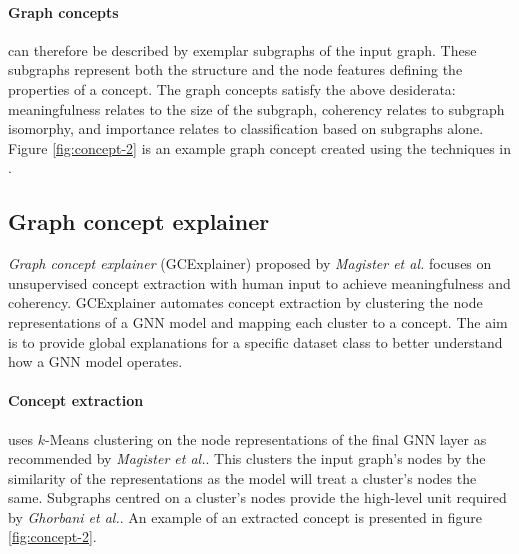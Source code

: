 
\paragraph{Graph concepts} can therefore be described by exemplar subgraphs of the input graph.
These subgraphs represent both the structure and the node features defining the properties of a concept.
The graph concepts satisfy the above desiderata: meaningfulness relates to the size of the subgraph, coherency relates to subgraph isomorphy, and importance relates to classification based on subgraphs alone.
Figure \ref{fig:concept-2} is an example graph concept created using the techniques in .



\subsection{Graph concept explainer}
\label{sec:GCE}



\emph{Graph concept explainer} (GCExplainer) proposed by \textit{Magister et al.}\cite{magister2021gcexplainer} focuses on unsupervised concept extraction with human input to achieve meaningfulness and coherency.
GCExplainer automates concept extraction by clustering the node representations of a GNN model and mapping each cluster to a concept.
The aim is to provide global explanations for a specific dataset class to better understand how a GNN model operates.



\paragraph{Concept extraction}
uses $k$-Means clustering on the node representations of the final GNN layer as recommended by \textit{Magister et al.}\cite{magister2021gcexplainer}.
This clusters the input graph's nodes by the similarity of the representations as the model will treat a cluster's nodes the same.
Subgraphs centred on a cluster's nodes provide the high-level unit required by \textit{Ghorbani et al.}\cite{ghorbani2019towards}.
An example of an extracted concept is presented in figure \ref{fig:concept-2}.

